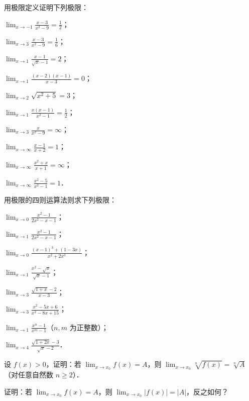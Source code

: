 \begin{xiti}
\item 用极限定义证明下列极限：
\begin{ziti}
\item $\lim_{x \to -1} \frac{x - 3}{x^2 - 9} = \frac{1}{2}$；
\item $\lim_{x \to 3} \frac{x - 3}{x^2 - 9} = \frac{1}{6}$；
\item $\lim_{x \to 1} \frac{x - 1}{\sqrt{x} - 1} = 2$；
\item $\lim_{x \to 1} \frac{(x-2)(x-1)}{x-3} = 0$；
\item $\lim_{x \to 2} \sqrt{x^2 + 5} = 3$；
\item $\lim_{x \to 1} \frac{x(x-1)}{x^2 - 1} = \frac{1}{2}$；
\item $\lim_{x \to 3} \frac{x}{x^2 - 9} = \infty$；
\item $\lim_{x \to \infty} \frac{x - 1}{x + 2} = 1$；
\item $\lim_{x \to \infty} \frac{x^2 + x}{x + 1} = \infty$；
\item $\lim_{x \to \infty} \frac{x^2 - 5}{x^2 - 1} = 1$．
\end{ziti}

\item 用极限的四则运算法则求下列极限：
\begin{ziti}
\item $\lim_{x \to 0} \frac{x^2 - 1}{2x^2 - x - 1}$；
\item $\lim_{x \to 1} \frac{x^2 - 1}{2x^2 - x - 1}$；
\item $\lim_{x \to 0} \frac{(x-1)^3 + (1-3x)}{x^2 + 2x^3}$；
\item $\lim_{x \to 1} \frac{x^2 - \sqrt{x}}{\sqrt{x} - 1}$；
\item $\lim_{x \to 3} \frac{\sqrt{1+x} - 2}{x - 3}$；
\item $\lim_{x \to 3} \frac{x^2 - 5x + 6}{x^2 - 8x + 15}$；
\item $\lim_{x \to 1} \frac{x^n - 1}{x^m - 1}$（$n, m$ 为正整数）；
\item $\lim_{x \to 4} \frac{\sqrt{1 + 2x} - 3}{\sqrt{x} - 2}$．
\end{ziti}

\item 设 $f(x) > 0$，证明：若 $\lim_{x \to x_0} f(x) = A$，则 $\lim_{x \to x_0} \sqrt[n]{f(x)} = \sqrt[n]{A}$（对任意自然数 $n \geqslant 2$）．

\item 证明：若 $\lim_{x \to x_0} f(x) = A$，则 $\lim_{x \to x_0} |f(x)| = |A|$，反之如何？


\end{xiti}
